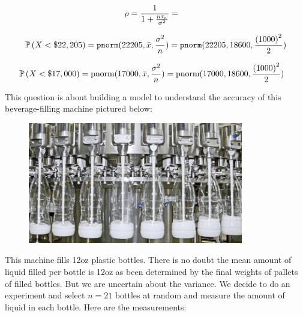 \documentclass[12pt]{article}
\begin{document}
\begin{enumerate}

\begin{align*}
    \rho &= \frac{1}{1 + \frac{n \tau_a}{\sigma^2}} =  
\end{align*}


\begin{align*}
    \mathbb{P}\left(X < \$22,205\right) = \texttt{pnorm}(22205, \bar{x}, \frac{\sigma^2}{n}) = \texttt{pnorm}(22205, 18600, \frac{\left(1000\right)^2}{2}) 
\end{align*}


\begin{align*}
    \mathbb{P}\left(X < \$17,000\right) &= \text{pnorm}(17000, \bar{x}, \frac{\sigma^2}{n}) = \text{pnorm}(17000, 18600, \frac{\left(1000\right)^2}{2})
\end{align*}

\end{enumerate}

\problem This question is about building a model to understand the accuracy of this beverage-filling machine pictured below:

\begin{figure}[htp]
\centering
\includegraphics[width=3.7in]{milk_filling.jpg}
\end{figure}

This machine fills 12oz plastic bottles. There is no doubt the mean amount of liquid filled per bottle is 12oz as been determined by the final weights of pallets of filled bottles. But we are uncertain about the variance. We decide to do an experiment and select $n = 21$ bottles at random and measure the amount of liquid in each bottle. Here are the measurements:
\end{document}
